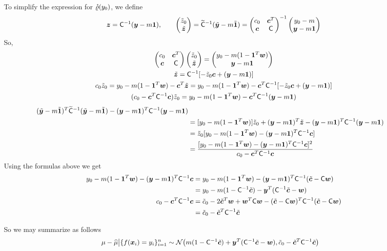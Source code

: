 \documentclass[graybox,footinfo]{svmult}
\begin{document}
To simplify the expression for $\rvarrho(y_0)$, we define
\[
\bsz = \mC^{-1} (\bsy - m \bsone), \qquad 
\begin{pmatrix} \tz_0 \\ \tbsz \end{pmatrix} = \tmC^{-1} (\tbsy - m \tbsone) 
= \begin{pmatrix} c_0 & \bsc^T \\ \bsc & \mC \end{pmatrix}^{-1} \begin{pmatrix} y_0 - m \\ \bsy - m \bsone \end{pmatrix}
\]
So,
\begin{gather*}
\begin{pmatrix} c_0 & \bsc^T \\ \bsc & \mC \end{pmatrix} \begin{pmatrix} \tz_0 \\ \tbsz \end{pmatrix} 
= \begin{pmatrix} y_0 - m(1 - \bsone^T\bsw) \\ \bsy - m \bsone \end{pmatrix} \\
\tbsz = \mC^{-1}[-\tz_0 \bsc + (\bsy - m \bsone )] \\
c_0 \tz_0 =y_0 - m(1 - \bsone^T\bsw)  - \bsc^T\tbsz =  y_0 - m(1 - \bsone^T\bsw)  - \bsc^T\mC^{-1}[-\tz_0 \bsc + (\bsy - m \bsone )] \\
(c_0 - \bsc^T\mC^{-1} \bsc) \tz_0 = y_0 - m(1 - \bsone^T\bsw)  - \bsc^T\mC^{-1}(\bsy - m \bsone )
\end{gather*}
\begin{align*}
(\tbsy - m \tbsone)^T \tmC^{-1} (\tbsy - m \tbsone) - (\bsy - m \bsone)^T \mC^{-1} (\bsy - 
m \bsone) \\
& = [y_0 - m(1 - \bsone^T\bsw)] \tz_0 + (\bsy - m \bsone)^T \tbsz - (\bsy - m \bsone)^T \mC^{-1} (\bsy - m \bsone) \\
& = \tz_0 [y_0 - m(1 - \bsone^T\bsw)  -  (\bsy - m \bsone)^T \mC^{-1} \bsc ] \\
& = \frac{[y_0 - m(1 - \bsone^T\bsw)  -  (\bsy - m \bsone)^T \mC^{-1} \bsc ]^2}{c_0 - \bsc^T\mC^{-1} \bsc}
\end{align*}
Using the formulas above we get
\begin{align*}
y_0 - m(1 - \bsone^T\bsw)  -  (\bsy - m \bsone)^T \mC^{-1} \bsc & = y_0 - m(1 - \bsone^T\bsw)  -  (\bsy - m \bsone)^T \mC^{-1}(\tbsc - \mC \bsw) \\
& = y_0 - m(1 - \mC^{-1}\tbsc) -  \bsy^T (\mC^{-1}\tbsc - \bsw) \\
c_0 - \bsc^T\mC^{-1} \bsc & = \tc_0 -2 \tbsc^T \bsw + \bsw^T \mC \bsw - (\tbsc - \mC \bsw)^T \mC^{-1} (\tbsc - \mC \bsw) \\
& =  \tc_0 - \tbsc ^T \mC^{-1} \tbsc
\end{align*}

So we may summarize as follows
\begin{align*}
\mu - \hmu \big \vert \{f(\bsx_i )= y_i\}_{i=1}^n &\sim \cn \bigl(m(1 - \mC^{-1}\tbsc) +  \bsy^T (\mC^{-1}\tbsc - \bsw), \tc_0 - \tbsc ^T \mC^{-1} \tbsc \bigr)
\end{align*}
\end{document}

